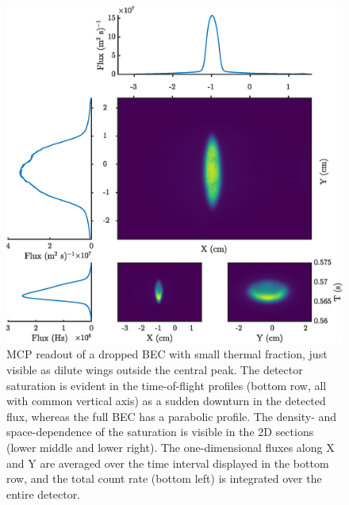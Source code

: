
	 \begin{figure}
	 	\centering
	 	\includegraphics[width=\textwidth]{fig/apparatus/dropped_bec}
	 	\caption{MCP readout of a dropped BEC with small thermal fraction, just visible as dilute wings outside the central peak.
		The detector saturation is evident in the time-of-flight profiles (bottom row, all with common vertical axis) as a sudden downturn in the detected flux, whereas the full BEC has a parabolic profile.
		The density- and space-dependence of the saturation is visible in the 2D sections (lower middle and lower right). The one-dimensional fluxes along X and Y are averaged over the time interval displayed in the bottom row, and the total count rate (bottom left) is integrated over the entire detector.}
	 	\label{fig:dropped_bec}
	 \end{figure}

